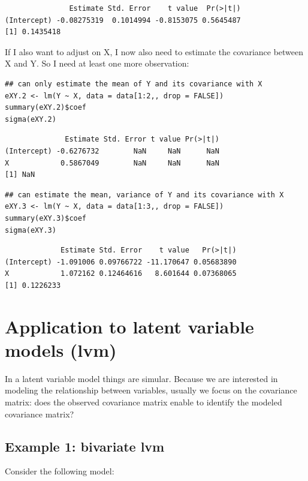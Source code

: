 \documentclass[12pt]{article}
\begin{document}
\begin{verbatim}
               Estimate Std. Error    t value  Pr(>|t|)
(Intercept) -0.08275319  0.1014994 -0.8153075 0.5645487
[1] 0.1435418
\end{verbatim}


\bigskip

If I also want to adjust on X, I now also need to estimate the
covariance between X and Y. So I need at least one more observation:

\bigskip

\lstset{language=r,label= ,caption= ,captionpos=b,numbers=none}
\begin{lstlisting}
## can only estimate the mean of Y and its covariance with X
eXY.2 <- lm(Y ~ X, data = data[1:2,, drop = FALSE])
summary(eXY.2)$coef
sigma(eXY.2)
\end{lstlisting}

\begin{verbatim}
              Estimate Std. Error t value Pr(>|t|)
(Intercept) -0.6276732        NaN     NaN      NaN
X            0.5867049        NaN     NaN      NaN
[1] NaN
\end{verbatim}

\lstset{language=r,label= ,caption= ,captionpos=b,numbers=none}
\begin{lstlisting}
## can estimate the mean, variance of Y and its covariance with X
eXY.3 <- lm(Y ~ X, data = data[1:3,, drop = FALSE])
summary(eXY.3)$coef
sigma(eXY.3)
\end{lstlisting}

\begin{verbatim}
             Estimate Std. Error    t value   Pr(>|t|)
(Intercept) -1.091006 0.09766722 -11.170647 0.05683890
X            1.072162 0.12464616   8.601644 0.07368065
[1] 0.1226233
\end{verbatim}

\clearpage

\section{Application to latent variable models (lvm)}
\label{sec:org969b607}

In a latent variable model things are simular. Because we are interested in modeling the
relationship between variables, usually we focus on the covariance matrix: does the observed
covariance matrix enable to identify the modeled covariance matrix? 

\subsection{Example 1: bivariate lvm}
\label{sec:org6528678}
Consider the following model:
\end{document}
